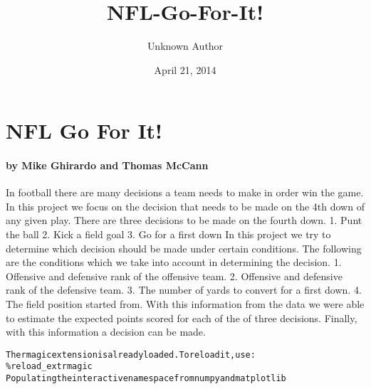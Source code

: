 \documentclass[letterpaper,10pt,english]{/anaconda/lib/python2.7/site-packages/sphinx/texinputs/sphinxhowto}
\title{NFL-Go-For-It!}
\date{April 21, 2014}
\author{Unknown Author}
\newenvironment{InvisibleVerbatim}
        {\begin{mdframed}[leftmargin=0.1\linewidth,innerleftmargin=3pt,innerrightmargin=3pt, userdefinedwidth=1\linewidth, linewidth=0pt, linecolor=white, usetwoside=false]}
        {\end{mdframed}}
\begin{document}
        
            \maketitle
        

        


        
        \section{NFL Go For It!}\paragraph{by Mike Ghirardo and Thomas McCann}In football there are many decisions a team needs to make in order win
the game. In this project we focus on the decision that needs to be made
on the 4th down of any given play. There are three decisions to be made
on the fourth down. 1. Punt the ball 2. Kick a field goal 3. Go for a
first down In this project we try to determine which decision should be
made under certain conditions. The following are the conditions which we
take into account in determining the decision. 1. Offensive and
defensive rank of the offensive team. 2. Offensive and defensive rank of
the defensive team. 3. The number of yards to convert for a first down.
4. The field position started from. With this information from the data
we were able to estimate the expected points scored for each of the of
three decisions. Finally, with this information a decision can be made.


    

        
        

            
                \begin{InvisibleVerbatim}
                \vspace{-0.5\baselineskip}
\begin{alltt}The rmagic extension is already loaded. To reload it, use:
  \%reload\_ext rmagic
Populating the interactive namespace from numpy and matplotlib
\end{alltt}

            \end{InvisibleVerbatim}
            
\end{document}
